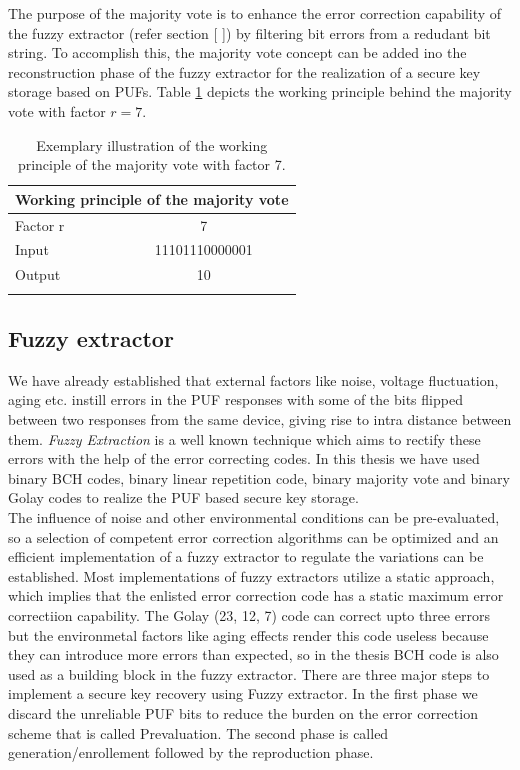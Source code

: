 The purpose of the majority vote is to enhance the error correction capability of the fuzzy extractor (refer section [ ]) by filtering bit errors from a redudant bit string. To accomplish this, the majority vote concept can be added ino the reconstruction phase of the fuzzy extractor for the realization of a secure key storage based on PUFs. Table \ref{mv} depicts the working principle behind the majority vote with factor $r = 7$.

\begin{table}[!ht]
\begin{center}
\begin{tabular}{lc}
\toprule
\multicolumn{2}{c}{\textbf{Working principle of the majority vote}}\\
\midrule
Factor r & 7 \\
Input & 11101110000001\\
Output & 10\\
\addlinespace
\bottomrule
\end{tabular}
\end{center}
\caption{Exemplary illustration of the working principle of the majority vote with factor 7.}
\label{mv}
\end{table}

\subsection{Fuzzy extractor}

We have already established that external factors like noise, voltage fluctuation, aging etc. instill errors in the PUF responses with some of the bits flipped between two responses from the same device, giving rise to intra distance between them. \emph{Fuzzy Extraction} is a well known technique which aims to rectify these errors with the help of the error correcting codes. In this thesis we have used binary BCH codes, binary linear repetition code, binary majority vote and binary Golay
codes to realize the PUF based secure key storage.\\

The influence of noise and other environmental conditions can be pre-evaluated, so a selection of competent error correction algorithms can be optimized and an efficient implementation of a fuzzy extractor to regulate the variations can be established. Most implementations of fuzzy extractors utilize a static approach, which implies that the enlisted error correction code has a static maximum error
correctiion capability. The Golay (23, 12, 7) code can correct upto three errors but the environmetal factors like aging effects render this code useless because they can introduce more errors than expected, so in the thesis BCH code is also used as a building block in the fuzzy extractor. There are three major steps to implement a secure key recovery using Fuzzy extractor. In the first phase we discard the unreliable PUF bits to reduce the burden on the error correction scheme that is called
Prevaluation. The second phase is called generation/enrollement followed by the reproduction phase.\\

